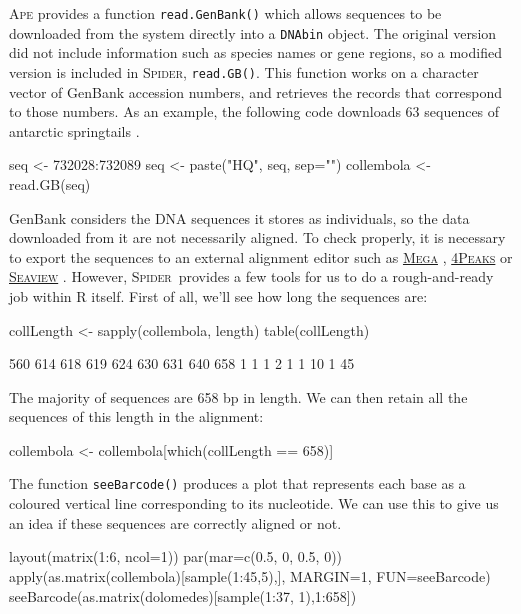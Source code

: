 \documentclass{article}
\newcommand{\spider}{\textsc{Spider}~} %
\newcommand{\Spider}{\textsc{Spider}} %
\newcommand{\progname}[1]{\textsc{#1}}
\newcommand{\fun}[1]{\texttt{#1}}
\begin{document}
\progname{Ape} provides a function \fun{read.GenBank()} which allows sequences to be downloaded from the system directly into a \fun{DNAbin} object. The original version did not include information such as species names or gene regions, so a modified version is included in \Spider, \fun{read.GB()}. This function works on a character vector of GenBank accession numbers, and retrieves the records that correspond to those numbers. As an example, the following code downloads 63 sequences of antarctic springtails \citep{Green.etal.2011}.

\begin{console}
seq <- 732028:732089
seq <- paste("HQ", seq, sep="")
collembola <- read.GB(seq)
\end{console}

GenBank considers the DNA sequences it stores as individuals, so the data downloaded from it are not necessarily aligned. To check properly, it is necessary to export the sequences to an external alignment editor such as \href{http://www.megasoftware.net}{\progname{Mega}} \citep{SW.Tamu.etal.2011.MEGA}, \href{http://www.mekentosj.com/science/4peaks}{\progname{4Peaks}} or \href{http://pbil.univ-lyon1.fr/software/seaview.html}{\progname{Seaview}} \citep{SW.Guoy.etal.2010.SeaView}. However,  \spider provides a few tools for us to do a rough-and-ready job within \progname{R} itself. First of all, we'll see how long the sequences are:

\begin{console}
collLength <- sapply(collembola, length)
table(collLength)
\end{console}

\begin{Routput}
 560 614 618 619 624 630 631 640 658 
  1   1   1   2   1   1  10   1  45
\end{Routput}

The majority of sequences are 658 bp in length. We can then retain all the sequences of this length in the alignment:

\begin{console}
collembola <- collembola[which(collLength == 658)]
\end{console}

The function \fun{seeBarcode()} produces a plot that represents each base as a coloured vertical line corresponding to its nucleotide. We can use this to give us an idea if these sequences are correctly aligned or not.

\begin{console}
layout(matrix(1:6, ncol=1))
par(mar=c(0.5, 0, 0.5, 0))
apply(as.matrix(collembola)[sample(1:45,5),], MARGIN=1, FUN=seeBarcode)
seeBarcode(as.matrix(dolomedes)[sample(1:37, 1),1:658])
\end{console}
\end{document}
